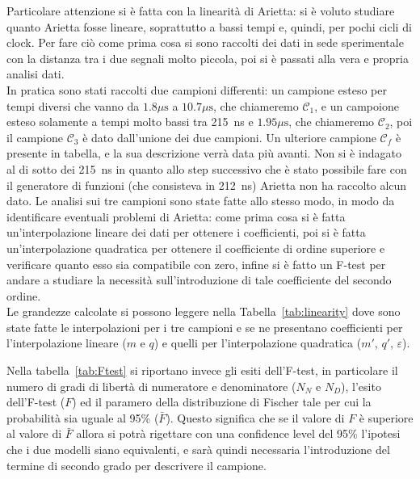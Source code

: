 Particolare attenzione si è fatta con la linearità di Arietta: si è voluto studiare quanto Arietta fosse lineare, soprattutto a bassi tempi e, quindi, per pochi cicli di clock. Per fare ciò come prima cosa si sono raccolti dei dati in sede sperimentale con la distanza tra i due segnali molto piccola, poi si è passati alla vera e propria analisi dati.\\

In pratica sono stati raccolti due campioni differenti: un campione esteso per tempi diversi che vanno da $1.8 \mu\text{s}$ a $10.7 \mu\text{s}$, che chiameremo $\mathcal{C}_1$, e un campoione esteso solamente a tempi molto bassi tra 215~ns e $1.95\mu\text{s}$, che chiameremo $\mathcal{C}_2$, poi il campione $\mathcal{C}_3$ è dato dall'unione dei due campioni. Un ulteriore campione $\mathcal{C}_f$ è presente in tabella, e la sua descrizione verrà data più avanti. Non si è indagato al di sotto dei 215~ns in quanto allo step successivo che è stato possibile fare con il generatore di funzioni (che consisteva in 212~ns) Arietta non ha raccolto alcun dato. Le analisi sui tre campioni sono state fatte allo stesso modo, in modo da identificare eventuali problemi di Arietta: come prima cosa si è fatta un'interpolazione lineare dei dati per ottenere i coefficienti, poi si è fatta un'interpolazione quadratica per ottenere il coefficiente di ordine superiore e verificare quanto esso sia compatibile con zero, infine si è fatto un F-test per andare a studiare la necessità sull'introduzione di tale coefficiente del secondo ordine.\\

Le grandezze calcolate si possono leggere nella Tabella~\ref{tab:linearity} dove sono state fatte le interpolazioni per i tre campioni e se ne presentano coefficienti per l'interpolazione lineare ($m$ e $q$) e quelli per l'interpolazione quadratica ($m'$, $q'$, $\varepsilon$).\\

Nella tabella~\ref{tab:Ftest} si riportano invece gli esiti dell'F-test, in particolare il numero di gradi di libertà di numeratore e denominatore ($N_N$ e $N_D$), l'esito dell'F-test ($F$) ed il paramero della distribuzione di Fischer tale per cui la probabilità sia uguale al 95\% ($\bar{F}$). Questo  significa che se il valore di $F$ è superiore al valore di $\bar{F}$ allora si potrà rigettare con una confidence level del 95\% l'ipotesi che i due modelli siano equivalenti, e  sarà quindi necessaria l'introduzione del termine di secondo grado per descrivere il campione.\\

